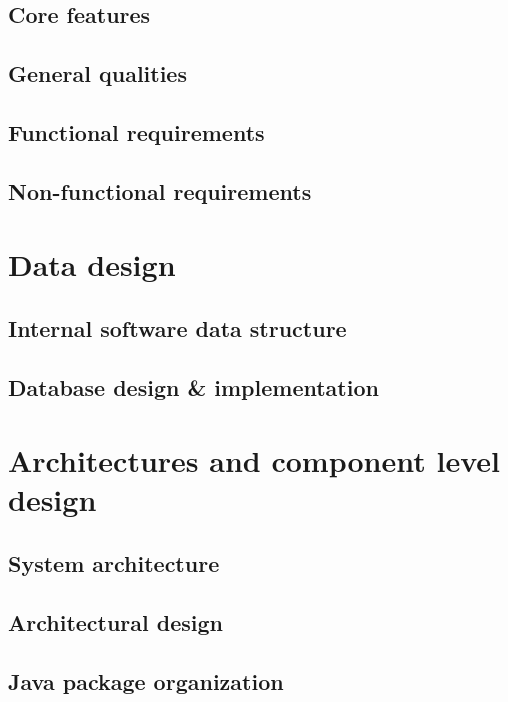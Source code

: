 \documentclass[a4paper]{scrreprt}
\begin{document}
\section{Core features}

\section{General qualities}

\section{Functional requirements}

\section{Non-functional requirements}

\chapter{Data design}

\section{Internal software data structure}

\section{Database design \& implementation}

\chapter{Architectures and component level design}

\section{System architecture}

\section{Architectural design}

\section{Java package organization}
\end{document}
